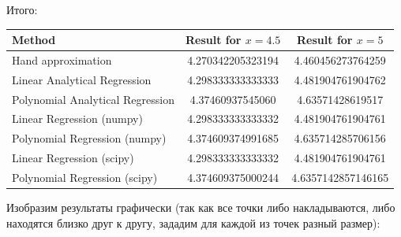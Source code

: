 \documentclass[a4paper, 14pt]{extarticle}
\begin{document}
Итого:

\begin{table}[h!]
    \centering
    \renewcommand{\arraystretch}{1.5} %
    \begin{tabular}{lcc}
    \toprule
    \textbf{Method} & \textbf{Result for \( x = 4.5 \)} & \textbf{Result for \( x = 5 \)} \\
    \midrule
    Hand approximation & 4.270342205323194 & 4.460456273764259 \\
    Linear Analytical Regression & 4.298333333333333 & 4.481904761904762 \\
    Polynomial Analytical Regression & 4.37460937545060 & 4.63571428619517 \\
    Linear Regression (numpy) & 4.298333333333332 & 4.481904761904761 \\
    Polynomial Regression (numpy) & 4.374609374991685 & 4.635714285706156 \\
    Linear Regression (scipy) & 4.298333333333332 & 4.481904761904761 \\
    Polynomial Regression (scipy) & 4.374609375000244 & 4.6357142857146165 \\
    \bottomrule
    \end{tabular}
\end{table}

Изобразим результаты графически (так как все точки либо накладываются, 
либо находятся близко друг к другу, зададим для каждой из точек разный размер):
\end{document}
